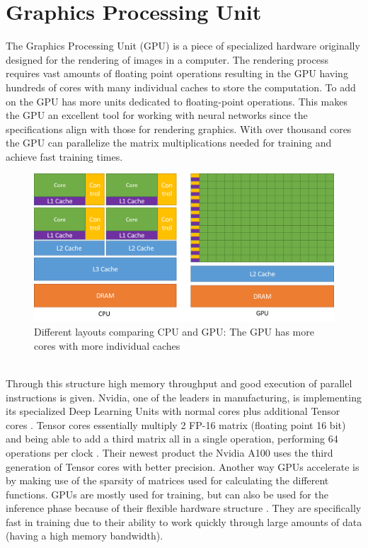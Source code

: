 \documentclass[conference]{IEEEtran}
\begin{document}
	\section{Graphics Processing Unit}
	The Graphics Processing Unit (GPU) is a piece of specialized hardware originally designed for the rendering of images in a computer. The rendering process requires vast amounts of floating point operations resulting in the GPU having hundreds of cores with many individual caches to store the computation. To add on the GPU has more units dedicated to floating-point operations. This makes the GPU an excellent tool for working with neural networks since the specifications align with those for rendering graphics. With over thousand cores the GPU can parallelize the matrix multiplications needed for training and achieve fast training times. 
	\begin{figure}[h]
		\caption{Different layouts comparing CPU and GPU: The GPU has more cores with more individual caches \cite{intelpic_comparison}}
		\centering
		\includegraphics[width=\linewidth]{pictures/intel_comparison.png}
	\end{figure}
	\\
	Through this structure high memory throughput and good execution of parallel instructions is given. Nvidia, one of the leaders in manufacturing, is implementing its specialized Deep Learning Units with normal cores plus additional Tensor cores \cite{nvidiav100}. Tensor cores essentially multiply 2 FP-16 matrix (floating point 16 bit) and being able to add a third matrix all in a single operation, performing 64 operations per clock \cite{tensorcores}. Their newest product the Nvidia A100 uses the third generation of Tensor cores with better precision.
	Another way GPUs accelerate is by making use of the sparsity of matrices used for calculating the different functions. GPUs are mostly used for training, but can also be used for the inference phase because of their flexible hardware structure \cite{capra2020updated}. They are specifically fast in training due to their ability to work quickly through large amounts of data (having a high memory bandwidth).
	\\
	
\end{document}
